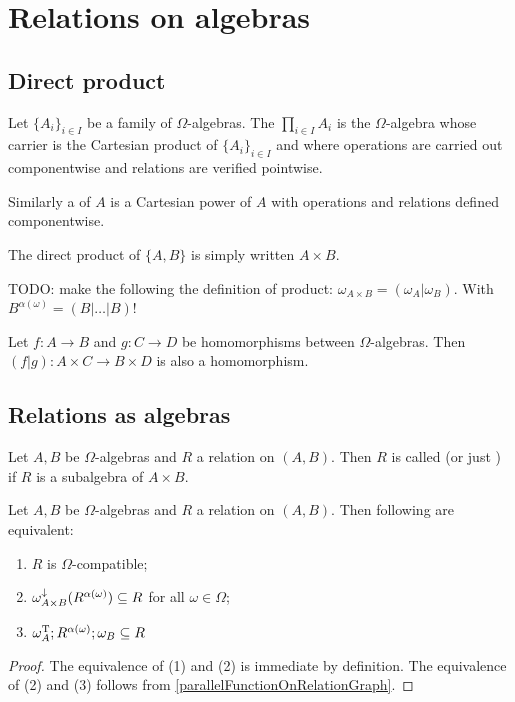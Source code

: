 \section{Relations on algebras}
\subsection{Direct product}
\begin{definition}
Let $\{A_i\}_{i\in I}$ be a family of $\Omega$-algebras. The  $\prod_{i\in I} A_i$ is the $\Omega$-algebra whose carrier is the Cartesian product of $\{A_i\}_{i\in I}$ and where operations are carried out componentwise and relations are verified pointwise.

Similarly a  of $A$ is a Cartesian power of $A$ with operations and relations defined componentwise.
\end{definition}

The direct product of $\{A,B\}$ is simply written $A\times B$.

TODO: make the following the definition of product: $\omega_{A\times B} = (\omega_A|\omega_B)$. With $B^{\alpha(\omega)} = (B|\ldots |B)$!

\begin{lemma}
Let $f: A\to B$ and $g: C\to D$ be homomorphisms between $\Omega$-algebras. Then $(f|g): A\times C\to B\times D$ is also a homomorphism.
\end{lemma}

\subsection{Relations as algebras}
\begin{definition}
Let $A,B$ be $\Omega$-algebras and $R$ a relation on $(A,B)$. Then $R$ is called  (or just ) if $R$ is a subalgebra of $A\times B$.
\end{definition}


\begin{lemma}
Let $A,B$ be $\Omega$-algebras and $R$ a relation on $(A,B)$. Then following are equivalent:
\begin{enumerate}
\item $R$ is $\Omega$-compatible;
\item $\omega_{A\times B}^\downarrow(R^{\alpha(\omega)}) \subseteq R$ for all $\omega\in \Omega$;
\item $\omega_A^{\mathrm{T}};R^{\alpha(\omega)};\omega_B \subseteq R$
\end{enumerate}
\end{lemma}
\begin{proof}
The equivalence of (1) and (2) is immediate by definition. The equivalence of (2) and (3) follows from \ref{parallelFunctionOnRelationGraph}.
\end{proof}

